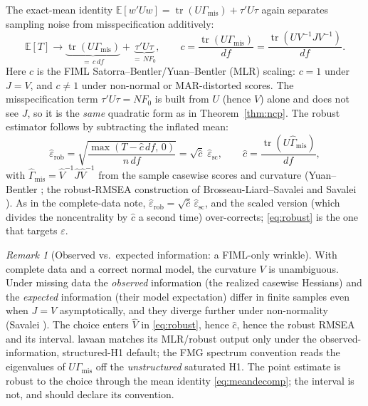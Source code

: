 \documentclass[11pt]{article}
\newcommand{\E}{\mathbb{E}}
\newcommand{\tr}{\operatorname{tr}}
\newcommand{\Gmis}{\Gamma_{\mathrm{mis}}}
\newcommand{\rmsea}{\widehat{\varepsilon}}
\theoremstyle{plain}
\theoremstyle{remark}
\newtheorem*{remark}{Remark}
\begin{document}
The exact-mean identity $\E[w'Uw]=\tr(U\Gmis)+\tau'U\tau$ again separates
sampling noise from misspecification additively:
\begin{equation}\label{eq:meandecomp}
  \E[T]\to \underbrace{\tr(U\Gmis)}_{=\,c\,df}+\underbrace{\tau'U\tau}_{=\,NF_0},
  \qquad
  c=\frac{\tr(U\Gmis)}{df}=\frac{\tr(UV^{-1}JV^{-1})}{df}.
\end{equation}
Here $c$ is the FIML Satorra--Bentler/Yuan--Bentler (MLR) scaling: $c=1$ under
$J=V$, and $c\ne1$ under non-normal or MAR-distorted scores. The
misspecification term $\tau'U\tau=NF_0$ is built from $U$ (hence $V$) alone and
does not see $J$, so it is the \emph{same} quadratic form as in
Theorem~\ref{thm:ncp}. The robust estimator follows by subtracting the inflated
mean:
\begin{equation}\label{eq:robust}
  \rmsea_{\mathrm{rob}}
    = \sqrt{\frac{\max(T-\hat c\,df,\,0)}{n\,df}}
    = \sqrt{\hat c}\;\rmsea_{\mathrm{sc}},
  \qquad
  \hat c=\frac{\tr(U\widehat\Gmis)}{df},
\end{equation}
with $\widehat\Gmis=\hat V^{-1}\hat J\hat V^{-1}$ from the sample casewise scores
and curvature (Yuan--Bentler \cite{yuanbentler2000}; the robust-RMSEA
construction of Brosseau-Liard--Savalei \cite{brosseauliardsavalei2012} and
Savalei \cite{savalei2018}). As in the complete-data note,
$\rmsea_{\mathrm{rob}}=\sqrt{\hat c}\,\rmsea_{\mathrm{sc}}$, and the scaled
version (which divides the noncentrality by $\hat c$ a second time) over-corrects;
\eqref{eq:robust} is the one that targets $\varepsilon$.

\begin{remark}[Observed vs.\ expected information: a FIML-only wrinkle]
With complete data and a correct normal model, the curvature $V$ is unambiguous.
Under missing data the \emph{observed} information (the realized casewise
Hessians) and the \emph{expected} information (their model expectation) differ in
finite samples even when $J=V$ asymptotically, and they diverge further under
non-normality (Savalei \cite{savalei2010}). The choice enters $\hat V$ in
\eqref{eq:robust}, hence $\hat c$, hence the robust RMSEA and its interval. lavaan
matches its MLR/robust output only under the observed-information,
structured-H1 default; the FMG spectrum convention reads the eigenvalues of
$U\Gmis$ off the \emph{unstructured} saturated H1. The point estimate is
robust to the choice through the mean identity \eqref{eq:meandecomp}; the
interval is not, and should declare its convention.
\end{remark}
\end{document}
